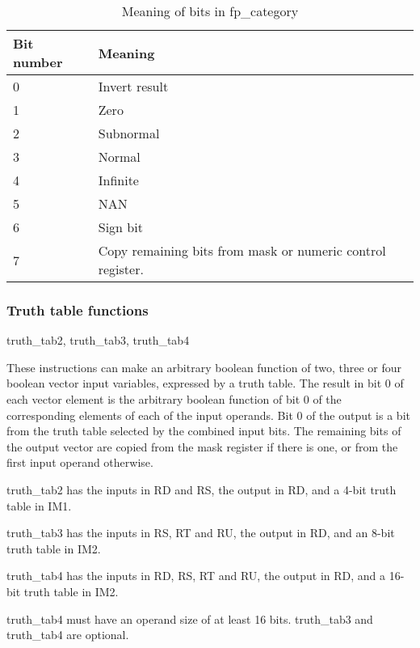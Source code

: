 \documentclass[forwardcom.tex]{subfiles}
\begin{document}
\begin{longtable} {|p{20mm}|p{90mm}|}
\caption{Meaning of bits in fp\_category} 
\label{table:fpCategoryInstructionBits} \\
\endfirsthead
\endhead
\hline
\bfseries Bit number & \bfseries Meaning  \\
\hline
0 & Invert result \\
1 & Zero \\
2 & Subnormal  \\
3 & Normal \\
4 & Infinite  \\
5 & NAN \\
6 & Sign bit  \\
7 & Copy remaining bits from mask or numeric control register.  \\
\hline
\end{longtable}
  

\subsubsection{Truth table functions} \label{truthTableFunctions}
truth\_tab2, truth\_tab3, truth\_tab4
\vspace{2mm}

These instructions can make an arbitrary boolean function of two, three or four boolean vector input variables, expressed by a truth table. The result in bit 0 of each vector element is the arbitrary boolean function of bit 0 of the corresponding elements of each of the input operands. Bit 0 of the output is a bit from the truth table selected by the combined input bits. The remaining bits of the output vector are copied from the mask register if there is one, or from the first input operand otherwise. 
\vspace{2mm}

truth\_tab2 has the inputs in RD and RS, the output in RD, and a 4-bit truth table in IM1.
\vspace{2mm}

truth\_tab3 has the inputs in RS, RT and RU, the output in RD, and an 8-bit truth table in IM2.
\vspace{2mm}

truth\_tab4 has the inputs in RD, RS, RT and RU, the output in RD, and a 16-bit truth table in IM2.
\vspace{2mm}

truth\_tab4 must have an operand size of at least 16 bits. truth\_tab3 and truth\_tab4 are optional.
\vspace{2mm}
\end{document}
